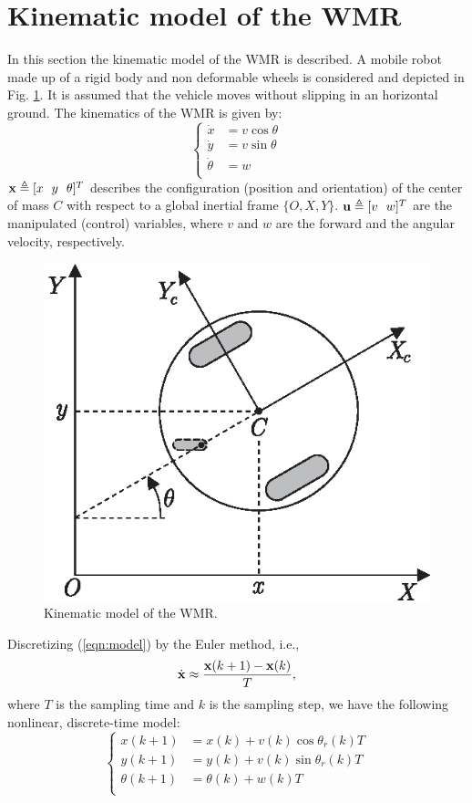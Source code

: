 \documentclass[twocolumn]{IEEEtran} %
\begin{document}
\section{Kinematic model of the WMR}\label{sec:model}
In this section the kinematic model of the WMR is described. A mobile robot made up of a rigid body and non deformable wheels is considered and depicted in Fig. \ref{fig:robot}. It is assumed that the vehicle moves without slipping in an horizontal ground. The kinematics of the WMR is given by:
\begin{equation}\label{eqn:model}
	\left\{
		\begin{aligned}
			\dot x	  &= v\cos\theta \\
			\dot y	  &= v\sin\theta \\
			\dot \theta &= w \\
		\end{aligned}
	\right.
\end{equation}
${\bf x}\triangleq[x~~y~~\theta]^T$ describes the configuration (position and orientation) of the center of mass $C$ with respect to a global inertial frame $\{O,X,Y\}$. ${\bf u}\triangleq[v~~w]^T$ are the manipulated (control) variables, where $v$ and $w$ are the forward and the angular velocity, respectively.
\begin{figure}[t]\begin{center}
    \includegraphics[width=.67\linewidth]{Figures/robot.eps}
    \caption{Kinematic model of the WMR.}
    \label{fig:robot}
\end{center}\end{figure}

Discretizing (\ref{eqn:model}) by the Euler method, i.e.,
\begin{equation*}
	\dot{\bf x} \approx \frac{{\bf x}(k+1)-{\bf x}(k)}{T},
\end{equation*}
where $T$ is the sampling time and $k$ is the sampling step, we have the following nonlinear, discrete-time model:
\begin{equation}\label{eqn:discretemodel}
	\left\{
		\begin{aligned}
			x(k+1)	    &= x(k) + v(k)\cos\theta_r(k)T \\
			y(k+1)	    &= y(k) + v(k)\sin\theta_r(k)T \\
			\theta(k+1) &= \theta(k) + w(k)T \\
		\end{aligned}
	\right.
\end{equation} 
\end{document}
